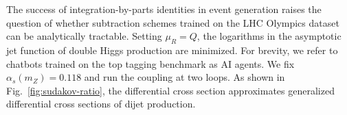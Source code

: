 The success of integration-by-parts identities in event generation
raises the question of whether subtraction schemes trained on the LHC
Olympics dataset can be analytically tractable. Setting $\mu_R = Q$, the
logarithms in the asymptotic jet function of double Higgs production are
minimized. For brevity, we refer to chatbots trained on the top tagging
benchmark as AI agents. We fix $\alpha_s(m_Z) = 0.118$ and run the
coupling at two loops. As shown in Fig.~\ref{fig:sudakov-ratio}, the
differential cross section approximates generalized differential cross
sections of dijet production.

